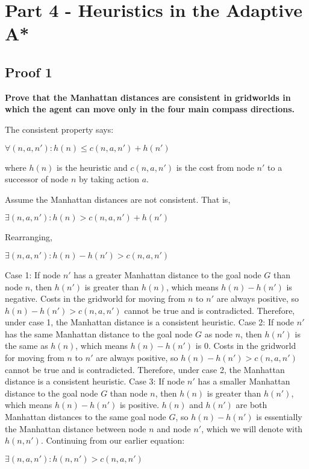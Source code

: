 \documentclass[10pt,a4paper]{article}
\begin{document}
\section*{Part 4 - Heuristics in the Adaptive A*}
\subsection*{Proof 1}
\textbf{Prove that the Manhattan distances are consistent in gridworlds in which the agent can move only in the four main compass directions.}

The consistent property says:
\begin{center} $\forall(n, a, n'): h(n) \leq c(n, a, n') + h(n')$\end{center}

where $h(n)$ is the heuristic and $c(n, a, n')$ is the cost from node $n'$ to a successor of node $n$ by taking action $a$.

Assume the Manhattan distances are not consistent. That is,
\begin{center} $\exists(n, a, n'): h(n) > c(n, a, n') + h(n')$\end{center}

Rearranging,
\begin{center} $\exists(n, a, n'): h(n) - h(n') > c(n, a, n')$\end{center}

Case 1: If node $n'$ has a greater Manhattan distance to the goal node $G$ than node $n$, then $h(n')$ is greater than $h(n)$, which means $h(n) - h(n')$ is negative. Costs in the gridworld for moving from $n$ to $n'$ are always positive, so $h(n) - h(n') > c(n, a, n')$ cannot be true and is contradicted. Therefore, under case 1, the Manhattan distance is a consistent heuristic.
\newline\newline
Case 2: If node $n'$  has the same Manhattan distance to the goal node $G$ as node $n$, then $h(n')$ is the same as $h(n)$, which means $h(n) - h(n')$ is $0$. Costs in the gridworld for moving from $n$ to $n'$ are always positive, so $h(n) - h(n') > c(n, a, n')$ cannot be true and is contradicted. Therefore, under case 2, the Manhattan distance is a consistent heuristic.
\newline\newline
Case 3: If node $n'$ has a smaller Manhattan distance to the goal node $G$ than node $n$, then $h(n)$ is greater than $h(n')$, which means $h(n) - h(n')$ is positive. $h(n)$ and $h(n')$ are both Manhattan distances to the same goal node $G$, so $h(n) - h(n')$ is essentially the Manhattan distance between node $n$ and node $n'$, which we will denote with $h(n, n')$. Continuing from our earlier equation:
\begin{center} $\exists(n, a, n'): h(n, n') > c(n, a, n')$\end{center}
\end{document}
